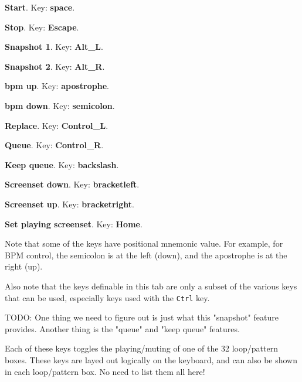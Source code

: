    \begin{enumber}
      \item \textbf{Start}.
         Key:  \textbf{space}.
      \item \textbf{Stop}.
         Key:  \textbf{Escape}.
      \item \textbf{Snapshot 1}.
         Key:  \textbf{Alt\_L}.
      \item \textbf{Snapshot 2}.
         Key:  \textbf{Alt\_R}.
      \item \textbf{bpm up}.
         Key:  \textbf{apostrophe}.
      \item \textbf{bpm down}.
         Key:  \textbf{semicolon}.
      \item \textbf{Replace}.
         Key:  \textbf{Control\_L}.
      \item \textbf{Queue}.
         Key:  \textbf{Control\_R}.
      \item \textbf{Keep queue}.
         Key:  \textbf{backslash}.
      \item \textbf{Screenset down}.
         Key: \index{keys![} \textbf{bracketleft}.
      \item \textbf{Screenset up}.
         Key: \index{keys!]} \textbf{bracketright}.
      \item \textbf{Set playing screenset}.
         Key:  \textbf{Home}.
   \end{enumber}

   Note that some of the keys have positional mnemonic value.  For example,
   for BPM control, the semicolon is at the left (down), and the apostrophe
   is at the right (up).

   Also note that the keys definable in this tab are only a subset of the
   various keys that can be used, especially keys used with the
   \texttt{Ctrl} key.

   TODO:  
   One thing we need to figure out is just what this "snapshot"
   feature provides.
   Another thing is the "queue" and "keep queue" features.

   Each of these keys toggles the playing/muting of one of the 32
   loop/pattern boxes.  These keys are layed out logically on the keyboard,
   and can also be shown in each loop/pattern box.  No need to list them all
   here!

